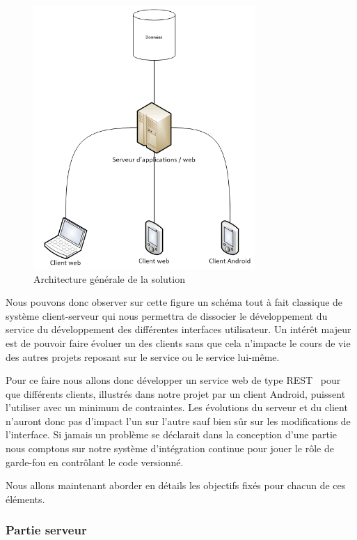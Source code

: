 \begin{figure}[H]
    \centering
    \includegraphics[height=10cm]{../infrastructure.png}
    \caption{Architecture générale de la solution}
    \label{architecture}
\end{figure}

Nous pouvons donc observer sur cette figure un schéma tout à fait classique de système client-serveur qui nous permettra de dissocier le développement du service du développement des différentes interfaces utilisateur. Un intérêt majeur est de pouvoir faire évoluer un des clients sans que cela n’impacte le cours de vie des autres projets reposant sur le service ou le service lui-même.

Pour ce faire nous allons donc développer un service web de type REST~\cite{rest} pour que différents clients, illustrés dans notre projet par un client Android, puissent l’utiliser avec un minimum de contraintes. Les évolutions du serveur et du client n’auront donc pas d’impact l’un sur l’autre sauf bien sûr sur les modifications de l’interface. Si jamais un problème se déclarait dans la conception d’une partie nous comptons sur notre système d’intégration continue pour jouer le rôle de garde-fou en contrôlant le code versionné.

Nous allons maintenant aborder en détails les objectifs fixés pour chacun de ces éléments.

\subsubsection{Partie serveur}

